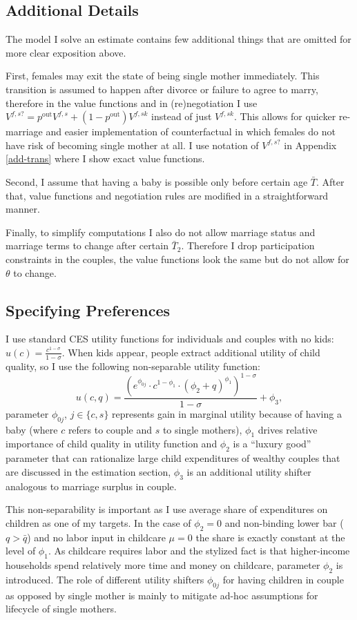 \subsection{Additional Details}
The model I solve an estimate contains few additional things that are omitted for more clear exposition above.

First, females may exit the state of being single mother immediately. This transition is assumed to happen after divorce or failure to agree to marry, therefore in the value functions and in (re)negotiation I use $V^{f,s?} = p^{\text{out}} V^{f,s} + (1-p^{\text{out}})V^{f,sk}$ instead of just $V^{f,sk}$. This allows for quicker re-marriage and easier implementation of counterfactual in which females do not have risk of becoming single mother at all. I use notation of $V^{f,s?}$ in Appendix \ref{add-trans} where I show exact value functions.

Second, I assume that having a baby is possible only before certain age $\bar{T}$. After that, value functions and negotiation rules are modified in a straightforward manner.

Finally, to simplify computations I also do not allow marriage status and marriage terms to change after certain $\bar{T}_2$. Therefore I drop participation constraints in the couples, the value functions look the same but do not allow for $\theta$ to change.

\subsection{Specifying Preferences\label{prefs}}
I use standard CES utility functions for individuals and couples with no kids: $u(c) = \frac{c^{1-\sigma}}{1-\sigma}$.  When kids appear, people extract additional utility of child quality, so I use the following non-separable utility function:
\[u(c,q) = \frac{\left(e^{\phi_{0j}}\cdot c^{1-\phi_1} \cdot (\phi_2 + q)^{\phi_1}\right)^{1-\sigma}}{1-\sigma} + \phi_3,\]
parameter $\phi_{0j}$, $j \in \{c,s\}$ represents gain in marginal utility because of having a baby (where $c$ refers to couple and $s$ to single mothers), $\phi_1$ drives relative importance of child quality in utility function and $\phi_2$ is a ``luxury good'' parameter that can rationalize large child expenditures of wealthy couples that are discussed in the estimation section, $\phi_3$ is an additional utility shifter analogous to marriage surplus in couple.

This non-separability is important as I use average share of expenditures on children as one of my targets. In the case of $\phi_2 = 0$ and non-binding lower bar ($q > \bar{q}$) and no labor input in childcare $\mu = 0$ the share is exactly constant at the level of $\phi_1$. As childcare requires labor and the stylized fact is that higher-income households spend relatively more time and money on childcare, parameter $\phi_2$ is introduced. The role of different utility shifters $\phi_{0j}$ for having children in couple as opposed by single mother is mainly to mitigate ad-hoc assumptions for lifecycle of single mothers. 

